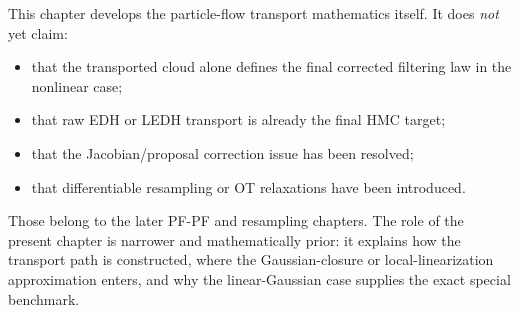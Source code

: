 This chapter develops the particle-flow transport mathematics itself.  It does
\emph{not} yet claim:
\begin{itemize}
  \item that the transported cloud alone defines the final corrected filtering
    law in the nonlinear case;
  \item that raw EDH or LEDH transport is already the final HMC target;
  \item that the Jacobian/proposal correction issue has been resolved;
  \item that differentiable resampling or OT relaxations have been introduced.
\end{itemize}
Those belong to the later PF-PF and resampling chapters.  The role of the
present chapter is narrower and mathematically prior: it explains how the
transport path is constructed, where the Gaussian-closure or local-linearization
approximation enters, and why the linear-Gaussian case supplies the exact
special benchmark.
